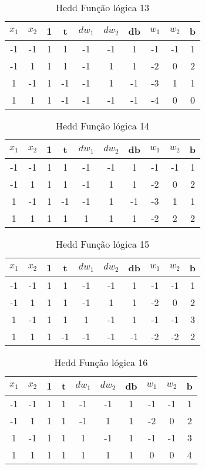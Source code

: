 \begin{table}[H]
\centering
\begin{tabular}{|c|c|c|c|c|c|c|c|c|c|}
\hline
$x_1$ & $x_2$ & 1 & t & $dw_1$ & $dw_2$ & db & $w_1$ & $w_2$ & b \\ \hline
-1 & -1 & 1 & 1 & -1 & -1 & 1 & -1 & -1 & 1\\ \hline
-1 & 1 & 1 & 1 & -1 & 1 & 1 & -2 & 0 & 2\\ \hline
1 & -1 & 1 & -1 & -1 & 1 & -1 & -3 & 1 & 1\\ \hline
1 & 1 & 1 & -1 & -1 & -1 & -1 & -4 & 0 & 0\\ \hline
\end{tabular}
\caption{Hedd Função lógica 13}\label{hedd:13}\end{table}

\begin{table}[H]
\centering
\begin{tabular}{|c|c|c|c|c|c|c|c|c|c|}
\hline
$x_1$ & $x_2$ & 1 & t & $dw_1$ & $dw_2$ & db & $w_1$ & $w_2$ & b \\ \hline
-1 & -1 & 1 & 1 & -1 & -1 & 1 & -1 & -1 & 1\\ \hline
-1 & 1 & 1 & 1 & -1 & 1 & 1 & -2 & 0 & 2\\ \hline
1 & -1 & 1 & -1 & -1 & 1 & -1 & -3 & 1 & 1\\ \hline
1 & 1 & 1 & 1 & 1 & 1 & 1 & -2 & 2 & 2\\ \hline
\end{tabular}
\caption{Hedd Função lógica 14}\label{hedd:14}\end{table}

\begin{table}[H]
\centering
\begin{tabular}{|c|c|c|c|c|c|c|c|c|c|}
\hline
$x_1$ & $x_2$ & 1 & t & $dw_1$ & $dw_2$ & db & $w_1$ & $w_2$ & b \\ \hline
-1 & -1 & 1 & 1 & -1 & -1 & 1 & -1 & -1 & 1\\ \hline
-1 & 1 & 1 & 1 & -1 & 1 & 1 & -2 & 0 & 2\\ \hline
1 & -1 & 1 & 1 & 1 & -1 & 1 & -1 & -1 & 3\\ \hline
1 & 1 & 1 & -1 & -1 & -1 & -1 & -2 & -2 & 2\\ \hline
\end{tabular}
\caption{Hedd Função lógica 15}\label{hedd:15}\end{table}

\begin{table}[H]
\centering
\begin{tabular}{|c|c|c|c|c|c|c|c|c|c|}
\hline
$x_1$ & $x_2$ & 1 & t & $dw_1$ & $dw_2$ & db & $w_1$ & $w_2$ & b \\ \hline
-1 & -1 & 1 & 1 & -1 & -1 & 1 & -1 & -1 & 1\\ \hline
-1 & 1 & 1 & 1 & -1 & 1 & 1 & -2 & 0 & 2\\ \hline
1 & -1 & 1 & 1 & 1 & -1 & 1 & -1 & -1 & 3\\ \hline
1 & 1 & 1 & 1 & 1 & 1 & 1 & 0 & 0 & 4\\ \hline
\end{tabular}
\caption{Hedd Função lógica 16}\label{hedd:16}\end{table}

